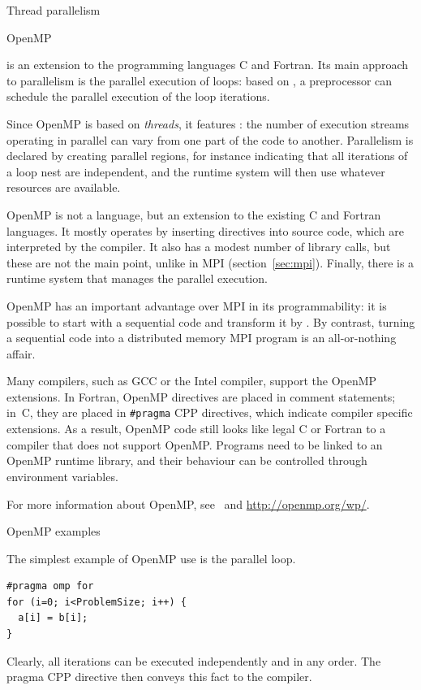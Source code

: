  {Thread parallelism}
\label{sec:threads}


 {OpenMP}
\label{sec:openmp}

 is an extension to the programming languages
C and Fortran.
Its main approach to parallelism is the parallel execution of loops:
based on , a preprocessor can schedule the parallel
execution of the loop iterations.

Since OpenMP is based on \emph{threads},
it features : the number of
execution streams operating in parallel can vary from one part of the
code to another. Parallelism is declared by creating
parallel regions, for instance indicating that all iterations 
of a loop nest are independent,
and the runtime system will then use whatever resources
are available.

OpenMP is not a language, but an extension to the existing C and
Fortran languages. It mostly operates by inserting
directives into source code, which are interpreted by the
compiler. It also has a modest number of library calls, but these are
not the main point, unlike in MPI (section~\ref{sec:mpi}). Finally,
there is a runtime system that manages the parallel execution.

OpenMP has an important advantage over MPI in its programmability:
it is possible to start with a sequential code and transform
it by . By contrast,
turning a sequential code into a distributed memory MPI program
is an all-or-nothing affair.

Many compilers, such as GCC or the Intel compiler, support
the OpenMP extensions. In Fortran, OpenMP directives are placed in
comment statements; in~C, they are placed in \verb+#pragma+ CPP
directives, which indicate compiler specific extensions. As a result,
OpenMP code still looks like legal C or Fortran to a compiler that
does not support OpenMP. Programs need to be linked to an OpenMP
runtime library, and their behaviour can be controlled through
environment variables.

For more information about OpenMP, see~\cite{Chapman2008:OpenMPbook}
and \url{http://openmp.org/wp/}.

 {OpenMP examples}
\label{omp:examples}

The simplest example of OpenMP use is the parallel loop. 
\begin{verbatim}
#pragma omp for
for (i=0; i<ProblemSize; i++) {
  a[i] = b[i];
}
\end{verbatim}
Clearly, all iterations can be executed independently and in any
order. The pragma CPP directive then conveys this fact to the
compiler.

